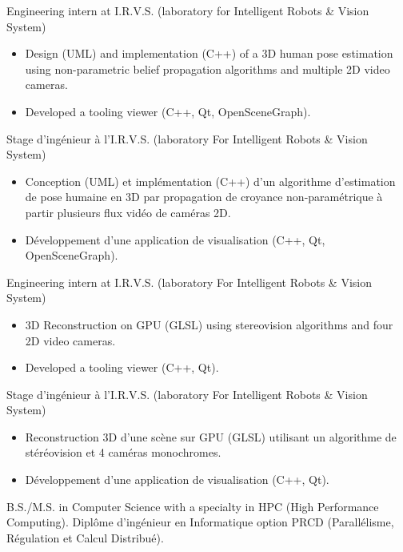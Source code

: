 \documentclass{article}
\begin{document}
\begin{llist}
 {
Engineering intern at I.R.V.S. (laboratory for Intelligent Robots \& Vision System)
\vspace{-0.50cm}
\begin{itemize}
	\item Design (UML) and implementation (C++) of a
		3D human pose estimation using non-parametric belief propagation
		algorithms and multiple 2D video cameras.
	\item Developed a tooling viewer (C++, Qt, OpenSceneGraph).
\end{itemize}
} {
Stage d'ing\'{e}nieur \`{a} l'I.R.V.S. (laboratory For Intelligent Robots \& Vision System)
\vspace{-0.50cm}
\begin{itemize}
	\item Conception (UML) et impl\'{e}mentation (C++) d'un algorithme
		d'estimation de pose humaine en 3D par propagation de croyance
		non-param\'{e}trique \`{a} partir plusieurs flux vid\'{e}o de cam\'{e}ras 2D.
	\item D\'{e}veloppement d'une application de visualisation (C++, Qt, OpenSceneGraph).
\end{itemize}
}

 {
Engineering intern at I.R.V.S. (laboratory For Intelligent Robots \& Vision System)
\vspace{-0.50cm}
\begin{itemize}
	\item 3D Reconstruction on GPU (GLSL) using stereovision algorithms and four 2D video cameras.
	\item Developed a tooling viewer (C++, Qt).
\end{itemize}
} {
Stage d'ing\'{e}nieur \`{a} l'I.R.V.S. (laboratory For Intelligent Robots \& Vision System)
\vspace{-0.50cm}
\begin{itemize}
	\item Reconstruction 3D d'une sc\`{e}ne sur GPU (GLSL) utilisant un algorithme
		de st\'{e}r\'{e}ovision et 4 cam\'{e}ras monochromes.
	\item D\'{e}veloppement d'une application de visualisation (C++, Qt).
\end{itemize}
}

 
 {
B.S./M.S. in Computer Science with a specialty in HPC (High Performance Computing).
} {
Dipl\^{o}me d'ing\'{e}nieur en Informatique option PRCD (Parall\'{e}lisme,
R\'{e}gulation et Calcul Distribu\'{e}).
}


\end{llist}
\end{document}
